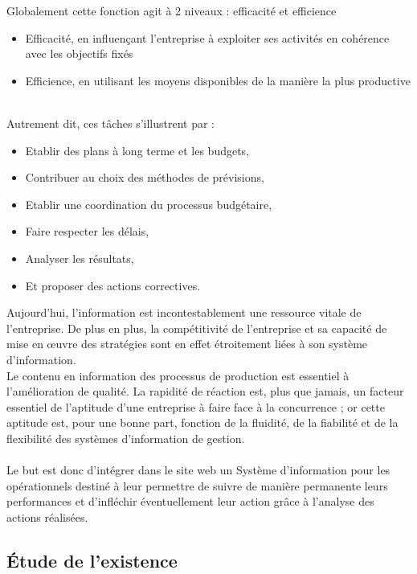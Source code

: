 \documentclass[12pt]{article}
\begin{document}
Globalement cette fonction agit à 2 niveaux : efficacité et efficience
\begin{itemize}
\item Efficacité, en influençant l'entreprise à exploiter ses activités en cohérence avec les objectifs fixés

\item Efficience, en utilisant les moyens disponibles de la manière la plus productive 
\end{itemize}
\\
Autrement dit, ces tâches s’illustrent par :
\begin{itemize}

\item Etablir des plans à long terme et les budgets,
\item Contribuer au choix des méthodes de prévisions,
\item Etablir une coordination du processus budgétaire,
\item Faire respecter les délais,
\item Analyser les résultats,
\item Et proposer des actions correctives.

\end{itemize}

Aujourd’hui,  l’information  est  incontestablement  une  ressource  vitale  de 
l’entreprise. De plus en plus, la compétitivité de l’entreprise et sa capacité de 
mise  en  œuvre  des  stratégies  sont  en  effet  étroitement  liées  à son  système 
d’information.\\
Le  contenu  en  information  des  processus  de  production  est  essentiel  à
l’amélioration de qualité.
La rapidité de réaction est, plus que jamais, un facteur essentiel de l’aptitude 
d’une  entreprise  à faire  face  à la  concurrence ;  or  cette  aptitude  est,  pour 
une bonne part, fonction de la fluidité, de la fiabilité et de la flexibilité des 
systèmes d’information de gestion. \\ \\
Le but est donc d’intégrer dans le site web un Système  d’information  pour  les  opérationnels  destiné à leur  permettre  de 
suivre   de   manière   permanente   leurs   performances   et 
d’infléchir 
éventuellement leur action grâce à l’analyse des actions réalisées.


\subsection{Étude de l’existence}
\end{document}
